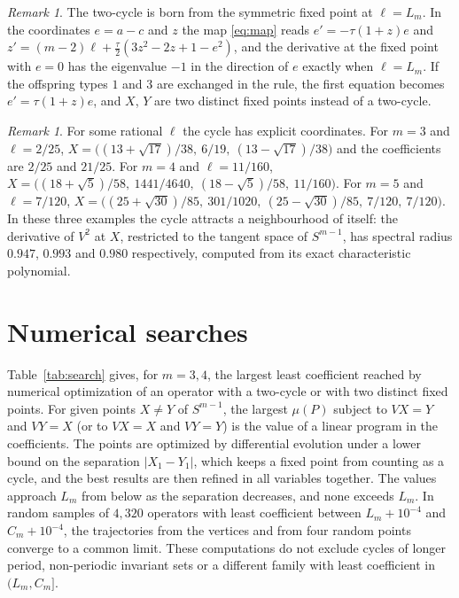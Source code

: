 \documentclass[11pt]{amsart}
\theoremstyle{definition}
\theoremstyle{remark}
\newtheorem{remark}[theorem]{Remark}
\begin{document}
\begin{remark}\label{rem:bifurcation}
The two-cycle is born from the symmetric fixed point at $\ell=L_m$. In the coordinates $e=a-c$ and $z$ the map
\eqref{eq:map} reads $e'=-\tau(1+z)e$ and $z'=(m-2)\ell+\frac\tau2(3z^2-2z+1-e^2)$, and the derivative at the fixed
point with $e=0$ has the eigenvalue $-1$ in the direction of $e$ exactly when $\ell=L_m$. If the offspring types $1$ and
$3$ are exchanged in the rule, the first equation becomes $e'=\tau(1+z)e$, and $X$, $Y$ are two distinct fixed points
instead of a two-cycle.
\end{remark}

\begin{remark}\label{rem:examples}
For some rational $\ell$ the cycle has explicit coordinates. For $m=3$ and $\ell=2/25$,
$X=\bigl((13+\sqrt{17})/38,\ 6/19,\ (13-\sqrt{17})/38\bigr)$ and the coefficients are $2/25$ and $21/25$. For $m=4$ and
$\ell=11/160$, $X=\bigl((18+\sqrt5)/58,\ 1441/4640,\ (18-\sqrt5)/58,\ 11/160\bigr)$. For $m=5$ and $\ell=7/120$,
$X=\bigl((25+\sqrt{30})/85,\ 301/1020,\ (25-\sqrt{30})/85,\ 7/120,\ 7/120\bigr)$. In these three examples the cycle
attracts a neighbourhood of itself: the derivative of $V^2$ at $X$, restricted to the tangent space of $S^{m-1}$, has
spectral radius $0.947$, $0.993$ and $0.980$ respectively, computed from its exact characteristic polynomial.
\end{remark}

\section{Numerical searches}\label{sec:numerics}

Table~\ref{tab:search} gives, for $m=3,4$, the largest least coefficient reached by numerical optimization of an
operator with a two-cycle or with two distinct fixed points. For given points $X\ne Y$ of $S^{m-1}$, the largest $\mu(P)$
subject to $VX=Y$ and $VY=X$ (or to $VX=X$ and $VY=Y$) is the value of a linear program in the coefficients. The points
are optimized by differential evolution under a lower bound on the separation $|X_1-Y_1|$, which keeps a fixed point
from counting as a cycle, and the best results are then refined in all variables together. The values approach $L_m$
from below as the separation decreases, and none exceeds $L_m$. In random samples of $4{,}320$ operators with least
coefficient between $L_m+10^{-4}$ and $C_m+10^{-4}$, the trajectories from the vertices and from four random points
converge to a common limit. These computations do not exclude cycles of longer period, non-periodic invariant sets or a
different family with least coefficient in $(L_m,C_m]$.
\end{document}
